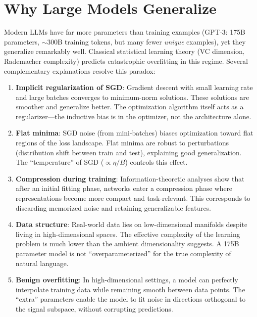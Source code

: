 \section{Why Large Models Generalize}
\label{sec:why_large_generalize}

Modern LLMs have far more parameters than training examples (GPT-3: 175B parameters, $\sim$300B training tokens, but many fewer \textit{unique} examples), yet they generalize remarkably well. Classical statistical learning theory (VC dimension, Rademacher complexity) predicts catastrophic overfitting in this regime. Several complementary explanations resolve this paradox:

\begin{enumerate}
    \item \textbf{Implicit regularization of SGD}: Gradient descent with small learning rate and large batches converges to minimum-norm solutions. These solutions are smoother and generalize better. The optimization algorithm itself acts as a regularizer---the inductive bias is in the optimizer, not the architecture alone.
    \item \textbf{Flat minima}: SGD noise (from mini-batches) biases optimization toward flat regions of the loss landscape. Flat minima are robust to perturbations (distribution shift between train and test), explaining good generalization. The ``temperature'' of SGD ($\propto \eta/B$) controls this effect.
    \item \textbf{Compression during training}: Information-theoretic analyses show that after an initial fitting phase, networks enter a compression phase where representations become more compact and task-relevant. This corresponds to discarding memorized noise and retaining generalizable features.
    \item \textbf{Data structure}: Real-world data lies on low-dimensional manifolds despite living in high-dimensional spaces. The effective complexity of the learning problem is much lower than the ambient dimensionality suggests. A 175B parameter model is not ``overparameterized'' for the true complexity of natural language.
    \item \textbf{Benign overfitting}: In high-dimensional settings, a model can perfectly interpolate training data while remaining smooth between data points. The ``extra'' parameters enable the model to fit noise in directions orthogonal to the signal subspace, without corrupting predictions.
\end{enumerate}

